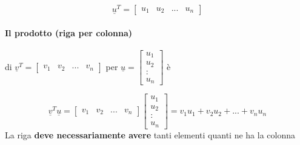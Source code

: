 $$
\underline{u}^T=
\begin{bmatrix}
    u_1 & u_2 & ... & u_n
\end{bmatrix}
$$

\paragraph{Il prodotto (riga per colonna)} di $\underline{v}^T=
\begin{bmatrix}
    v_1 & v_2& ... & v_n
\end{bmatrix}$
per 
$
\underline{u}=
\begin{bmatrix}
    u_1\\u_2\\:\\u_n
\end{bmatrix}
$ è 

$$\underline{v}^T\underline{u}=
\begin{bmatrix}
    v_1 & v_2 & ... & v_n
\end{bmatrix}
\begin{bmatrix}
    u_1\\u_2\\:\\u_n
\end{bmatrix}
=v_1u_1+v_2u_2+...+v_nu_n
$$
{\color{red}
La riga \textbf{deve necessariamente avere} tanti elementi quanti ne ha la colonna
}
